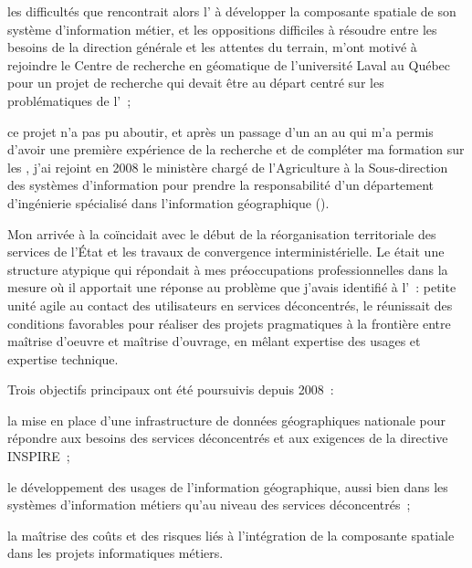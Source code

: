 \item les difficultés que rencontrait alors l'{\ONF}
      à développer la composante spatiale de son
      système d'information métier, et les oppositions
      difficiles à résoudre entre les besoins de la direction générale
      et les attentes du terrain, m'ont motivé à rejoindre
      le Centre de recherche en géomatique de l'université Laval au Québec
      pour un projet de recherche qui devait être au départ
      centré sur les problématiques de l'{\ONF}~;

\item ce projet n'a pas pu aboutir,
      et après un passage d'un an au {\CRG} qui m'a permis
      d'avoir une première expérience de la recherche et de
      compléter ma formation sur les {\SIG}, j'ai rejoint en 2008 le ministère
      chargé de l'Agriculture à la Sous-direction des systèmes 
      d'information pour prendre la responsabilité
      d'un département d'ingénierie spécialisé dans
      l'information géographique ({\DIG}).

\stopitemize

Mon arrivée à la {\SDSI}
coïncidait avec le début de la réorganisation territoriale
des services de l'État et les travaux de convergence
interministérielle.
Le {\DIG} était une structure atypique qui répondait à mes préoccupations professionnelles
dans la mesure où il apportait une réponse au problème que j'avais identifié à l'{\ONF}~:
petite unité agile au contact des utilisateurs en services déconcentrés,
le {\DIG} réunissait des conditions favorables pour réaliser des projets pragmatiques à la frontière
entre maîtrise d'oeuvre et maîtrise d'ouvrage,
en mêlant expertise des usages et expertise technique.

Trois objectifs principaux ont été poursuivis depuis 2008~:

\startitemize

\item la mise en place d'une infrastructure
      de données géographiques nationale pour répondre aux besoins
      des services déconcentrés et aux exigences
      de la directive INSPIRE~;

\item le développement des usages de l'information géographique,
      aussi bien dans les systèmes d'information métiers
      qu'au niveau des services déconcentrés~;

\item la maîtrise des coûts et des risques
      liés à l'intégration de la composante spatiale
      dans les projets informatiques métiers.

